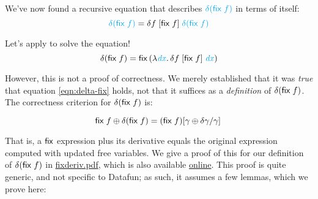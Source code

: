 \documentclass{article}
\begin{document}
We've now found a recursive equation that describes
${\color{Cyan}\delta(\ms{fix}\;f)}$ in terms of itself:
\begin{equation}\label{eqn:delta-fix}
  {\color{Cyan} \delta(\ms{fix}\;f)}
  = \delta f \;\disc{\ms{fix}\; f} \; {\color{Cyan}\delta(\ms{fix}\;f)}
\end{equation}

Let's apply  to solve the equation!
\begin{equation*}
  \delta(\ms{fix}\; f)
  =
  \ms{fix}\,(\fn\bind{\m{\color{Cyan} dx}}
  \delta f \;\disc{\ms{fix}\;f} \;{\m{\color{Cyan} dx}})
\end{equation*}

However, this is not a proof of correctness. We merely established that it
was \emph{true} that equation \ref{eqn:delta-fix} holds, not that it suffices as
a \emph{definition} of $\delta(\mathsf{fix}\;f)$. The correctness criterion for
$\delta(\mathsf{fix}\; f)$ is:

\begin{equation}
  \mathsf{fix}\;f \oplus \delta(\mathsf{fix}\;f)
  = (\mathsf{fix}\;f)[{\gamma \oplus \delta\gamma/\gamma}]\,
\end{equation}

That is, a $\mathsf{fix}$ expression plus its derivative equals the original
expression computed with updated free variables. We give a proof of this for our
definition of $\delta(\mathsf{fix}\;f)$ in \url{fixderiv.pdf}, which is also
available \href{http://www.rntz.net/files/fixderiv.pdf}{online}. This proof is
quite generic, and not specific to Datafun; as such, it assumes a few lemmas,
which we prove here:

\par {}


\end{document}
